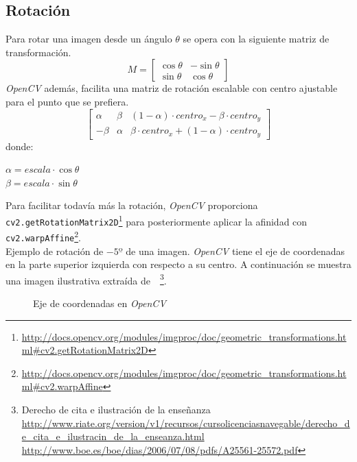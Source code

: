 \subsection{Rotación}
Para rotar una imagen desde un ángulo $\theta$ se opera con la siguiente
matriz de transformación.
\begin{equation*}
  M =
  \begin{bmatrix}
    \cos \theta & -\sin \theta \\ \sin \theta & \cos \theta
  \end{bmatrix}
\end{equation*}
\emph{OpenCV} además, facilita una matriz de rotación escalable con
centro ajustable para el punto que se prefiera.
\begin{equation*}
  \begin{bmatrix}
    \alpha & \beta & (1 - \alpha) \cdot centro_x - \beta \cdot centro_y \\
    - \beta & \alpha & \beta \cdot centro_x + (1 - \alpha) \cdot centro_y
  \end{bmatrix}
\end{equation*}
donde:
\begin{center}
  $ \alpha = escala \cdot \cos \theta $
  \\
  $ \beta = escala \cdot \sin \theta $
\end{center}
Para facilitar todavía más la rotación, \emph{OpenCV} proporciona
\texttt{cv2.getRotationMatrix2D}\footnote{\url{http://docs.opencv.org/modules/imgproc/doc/geometric\_transformations.html\#cv2.getRotationMatrix2D}}
para posteriormente aplicar la afinidad con
\texttt{cv2.warpAffine}\footnote{\url{http://docs.opencv.org/modules/imgproc/doc/geometric\_transformations.html\#cv2.warpAffine}}.\\

Ejemplo de rotación de $-5º$ de una imagen. \emph{OpenCV} tiene el eje
de coordenadas en la parte superior izquierda con respecto a su
centro. A continuación se muestra una imagen ilustrativa extraída
de~\citep*{opencv_tutorial-bib}~\footnote{Derecho de
  cita e ilustración de la enseñanza\\
  \url{http://www.riate.org/version/v1/recursos/cursolicenciasnavegable/derecho_de_cita_e_ilustracin_de_la_enseanza.html}\\
  \url{http://www.boe.es/boe/dias/2006/07/08/pdfs/A25561-25572.pdf}}.

\begin{figure}[H]
  \caption{Eje de coordenadas en \emph{OpenCV}}
  \centering \setlength\fboxsep{0pt} \setlength\fboxrule{0.5pt}
\end{figure}


